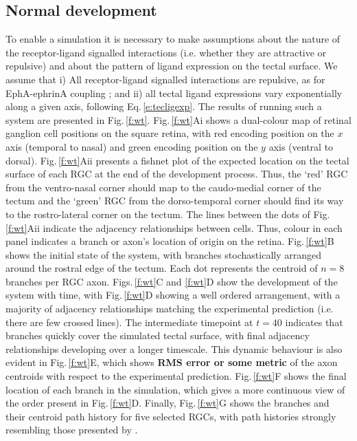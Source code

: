 \documentclass[11pt, a4paper]{article}
\begin{document}
\subsection*{Normal development}

To enable a simulation it is necessary to make assumptions about the nature of
the receptor-ligand signalled interactions (i.e. whether they are attractive
or repulsive) and about the pattern of ligand expression on the tectal
surface. We assume that i) All receptor-ligand signalled interactions are
repulsive, as for EphA-ephrinA
coupling \citep{drescher_vitro_1995,nakamoto_topographically_1996}; and ii)
all tectal ligand expressions vary exponentially along a given axis, following
Eq.\,\ref{e:tecligexp}. The results of running such a system are presented in
Fig.\,\ref{f:wt}.
%
Fig.\,\ref{f:wt}Ai shows a dual-colour map of retinal ganglion cell positions
on the square retina, with red encoding position on the $x$ axis (temporal to
nasal) and green encoding position on the $y$ axis (ventral to
dorsal). Fig.\,\ref{f:wt}Aii presents a fishnet plot of the expected location on
the tectal surface of each RGC at the end of the development process. Thus,
the `red' RGC from the ventro-nasal corner should map to the caudo-medial
corner of the tectum and the `green' RGC from the dorso-temporal corner should
find its way to the rostro-lateral corner on the tectum. The lines between the
dots of Fig.\,\ref{f:wt}Aii indicate the adjacency relationships between
cells. Thus, colour in each panel indicates a branch or axon's location of
origin on the retina.
%
Fig.\,\ref{f:wt}B shows the initial state of the system, with branches
stochastically arranged around the rostral edge of the tectum. Each dot
represents the centroid of $n=8$ branches per RGC axon. Figs.\,\ref{f:wt}C and \ref{f:wt}D
show the development of the system with time, with Fig.\,\ref{f:wt}D showing a
well ordered arrangement, with a majority of adjacency relationships matching
the experimental prediction (i.e. there are few crossed lines). The
intermediate timepoint at $t=40$ indicates that branches quickly cover the simulated
tectal surface, with final adjacency relationships developing over a longer
timescale. This dynamic behaviour is also evident in Fig.\,\ref{f:wt}E, which
shows \textbf{RMS error or some metric} of the axon centroids with respect to
the experimental prediction. Fig.\,\ref{f:wt}F shows the final
location of each branch in the simulation, which gives a more continuous view
of the order present in Fig.\,\ref{f:wt}D. Finally, Fig.\,\ref{f:wt}G shows the
branches and their centroid path history for five selected RGCs, with path
histories strongly resembling those presented by \citet{simpson_simple_2011}.
\end{document}
